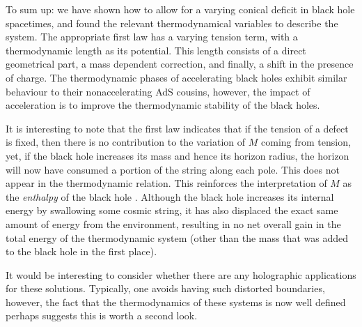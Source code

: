 \documentclass[
twoside,
openright,
frontopenright,
]{dmathesis}
\begin{document}
To sum up: we have shown how to allow for a varying conical deficit
in black hole spacetimes, and found the relevant thermodynamical 
variables to describe the system. The appropriate first law has a 
varying tension term, with a thermodynamic length as its potential. 
This length consists of a direct geometrical part, a mass dependent correction, 
and finally, a shift in the presence of charge. The thermodynamic phases of
accelerating black holes exhibit similar behaviour to their nonaccelerating 
AdS cousins, however, the impact of acceleration is to improve the thermodynamic
stability of the black holes.

It is interesting to note that the first law indicates that if the tension of a
defect is fixed, then there is no contribution to the variation of $M$ coming
from tension, yet, if the black hole increases its mass and hence its horizon
radius, the horizon will now have consumed a portion of the string along each
pole.  This does not appear in the thermodynamic relation. This reinforces the
interpretation of $M$ as the {\it enthalpy} of the black hole
\cite{Kastor:2009wy}.  Although the black hole increases its internal energy by
swallowing some cosmic string, it has also displaced the exact same amount of
energy from the environment, resulting in no net overall gain in the total
energy of the thermodynamic system (other than the mass that was added to the
black hole in the first place).

It would be interesting to consider whether there are any holographic
applications for these solutions. Typically, one avoids having such distorted
boundaries, however, the fact that the thermodynamics of these systems is now
well defined perhaps suggests this is worth a second look.
\end{document}
